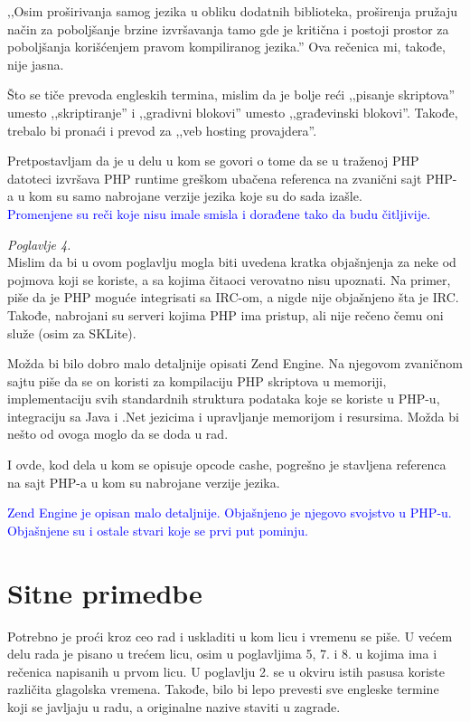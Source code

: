 \documentclass[a4paper]{report}
\newcommand{\odgovor}[1]{\textcolor{blue}{#1}}
\begin{document}
‚‚Osim proširivanja samog jezika u obliku dodatnih biblioteka, proširenja pružaju način za poboljšanje brzine izvršavanja tamo gde je kritična i postoji prostor za poboljšanja korišćenjem pravom kompiliranog jezika.'' Ova rečenica mi, takođe, nije jasna.

Što se tiče prevoda engleskih termina, mislim da je bolje reći ,,pisanje skriptova'' umesto ,,skriptiranje'' i ,,gradivni blokovi'' umesto ,,građevinski blokovi''. Takođe, trebalo bi pronaći i prevod za ,,veb hosting provajdera''.

Pretpostavljam da je u delu u kom se govori o tome da se u traženoj PHP datoteci izvršava PHP runtime greškom ubačena referenca na zvanični sajt PHP-a u kom su samo nabrojane verzije jezika koje su do sada izašle.\\
\odgovor{Promenjene su reči koje nisu imale smisla i dorađene tako da budu čitljivije.}

\textit{Poglavlje 4.}\\

Mislim da bi u ovom poglavlju mogla biti uvedena kratka objašnjenja za neke od pojmova koji se koriste, a sa kojima čitaoci verovatno nisu upoznati. Na primer, piše da je PHP moguće integrisati sa IRC-om, a nigde nije objašnjeno šta je IRC. Takođe, nabrojani su serveri kojima PHP ima pristup, ali nije rečeno čemu oni služe (osim za SKLite).

Možda bi bilo dobro malo detaljnije opisati Zend Engine. Na njegovom zvaničnom sajtu piše da se on koristi za kompilaciju PHP skriptova u memoriji, implementaciju svih standardnih struktura podataka koje se koriste u PHP-u, integraciju sa Java i .Net jezicima i upravljanje memorijom i resursima. Možda bi nešto od ovoga moglo da se doda u rad.

I ovde, kod dela u kom se opisuje opcode cashe, pogrešno je stavljena referenca na sajt PHP-a u kom su nabrojane verzije jezika.

\odgovor{Zend Engine je opisan malo detaljnije. Objašnjeno je njegovo svojstvo u PHP-u. Objašnjene su i ostale stvari koje se prvi put pominju. }

\section{Sitne primedbe}

Potrebno je proći kroz ceo rad i uskladiti u kom licu i vremenu se piše. U većem delu rada je pisano u trećem licu, osim u poglavljima 5, 7. i 8. u kojima ima i rečenica napisanih u prvom licu. U poglavlju 2. se u okviru istih pasusa koriste različita glagolska vremena. Takođe, bilo bi lepo prevesti sve engleske termine koji se javljaju u radu, a originalne nazive staviti u zagrade.
\end{document}
